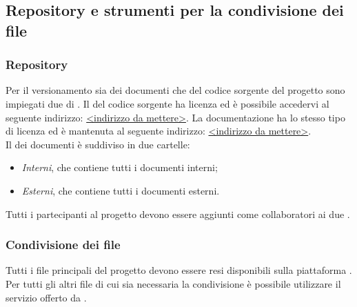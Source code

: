 \subsection{Repository e strumenti per la condivisione dei file}

\subsubsection{Repository}
Per il versionamento sia dei documenti che del codice sorgente del progetto sono impiegati due  di . Il  del codice sorgente ha licenza  ed è possibile accedervi al seguente indirizzo: \url{<indirizzo da mettere>}.
La documentazione ha lo stesso tipo di licenza ed è mantenuta al seguente indirizzo: \url{<indirizzo da mettere>}.\\
Il  dei documenti è suddiviso in due cartelle: 
\begin{itemize}
	\item \textit{Interni}, che contiene tutti i documenti interni;
	\item \textit{Esterni}, che contiene tutti i documenti esterni.
\end{itemize}
Tutti i partecipanti al progetto devono essere aggiunti come collaboratori ai due .

\subsubsection{Condivisione dei file}
Tutti i file principali del progetto devono essere resi disponibili sulla piattaforma . Per tutti gli altri file di cui sia necessaria la condivisione è possibile utilizzare il servizio offerto da .

